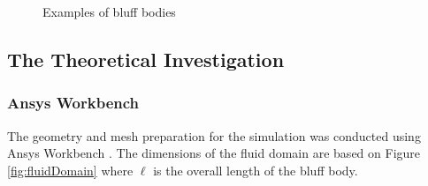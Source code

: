 \begin{figure}[H]
\begin{center}
	\end{center}
	\caption{Examples of bluff bodies}
	\label{fig:bluffBodies}
\end{figure}
\subsection{The Theoretical Investigation}
\subsubsection{Ansys Workbench}
\label{sec:ansysWorkbench}
The geometry and mesh preparation for the simulation was conducted using Ansys Workbench \parencite{noauthor_ansys_nodate}. The dimensions of the fluid domain are based on Figure \ref{fig:fluidDomain} where $\ell$ is the overall length of the bluff body.

\newlength\unitL
\setlength\unitL{0.2cm}

